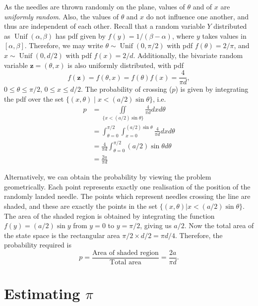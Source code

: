 \documentclass[11pt]{article}
\begin{document}
As the needles are thrown randomly on the plane, values of \(\theta\) and of \(x\) are \textit{uniformly random}. 
Also, the values of \(\theta\) and \(x\) do not influence one another, and thus are independent of each other. 
Recall that a random variable \(Y\) distributed as \(\operatorname{Unif}(\alpha,\beta)\) has pdf given by \(f(y) = 1/(\beta-\alpha)\), where \(y\) takes values in \([\alpha,\beta]\).
Therefore, we may write \(\theta \sim \operatorname{Unif}(0,\pi/2)\) with pdf \(f(\theta)=2/\pi\), and \(x \sim \operatorname{Unif}(0,d/2)\) with pdf \(f(x)=2/d\). 
Additionally, the bivariate random variable \(\mathbf z = (\theta,x)\) is also uniformly distributed, with pdf 
\[
f(\mathbf z) = f(\theta,x) = f(\theta)f(x) = \frac{4}{\pi d},
\] 
\(0\leq\theta\leq \pi/2\), \(0\leq x \leq d/2\). 
The probability of crossing (\(p\)) is given by integrating the pdf over the set \(\{(x,\theta) \mid x < (a/2)\sin\theta \}\), i.e. 
\begin{align*}
p &= \iint\limits_{\{x < (a/2)\sin\theta\}} \frac{4}{\pi d} d x d\theta \\
&= \int_{\theta=0}^{\pi/2} \int_{x=0}^{(a/2)\sin\theta} \frac{4}{\pi d} d x d \theta \\
&= \frac{4}{\pi d} \int_{\theta=0}^{\pi/2} (a/2)\sin\theta d \theta \\
&= \frac{2a}{\pi d}
\end{align*}

Alternatively, we can obtain the probability by viewing the problem geometrically. 
Each point represents exactly one realisation of the position of the randomly landed needle. 
The points which represent needles crossing the line are shaded, and these are exactly the points in the set \(\{(x,\theta)| x < (a/2)\sin\theta \}\). 
The area of the shaded region is obtained by integrating the function \(f(y) = (a/2)\sin y\) from \(y=0\) to \(y=\pi/2\), giving us \(a/2\).
Now the total area of the state space is the rectangular area \(\pi/2 \times d/2 = \pi d / 4\). 
Therefore, the probability required is
\begin{equation}
p = \frac{\text{Area of shaded region}}{\text{Total area}} = \frac{2a}{\pi d}.
\end{equation}

\section{Estimating $\pi$}
\end{document}
